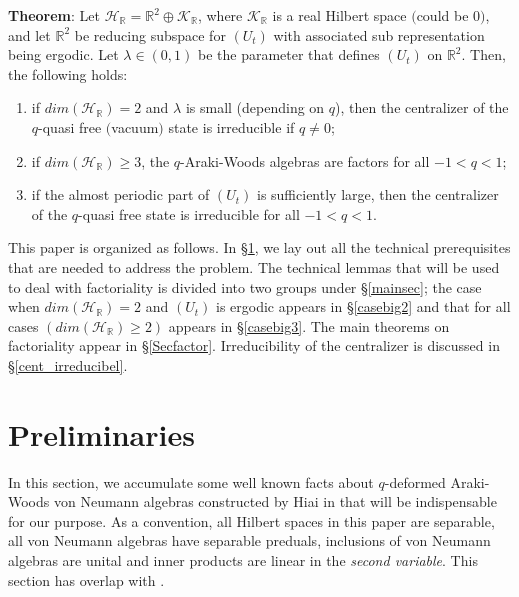 \documentclass[12pt, a4paper,reqno]{amsart}
\theoremstyle{definition}
\renewcommand{\geq}{\geqslant}
\def\R{\mathbb R}
\newcommand{\CH}{\mathcal{H}}
\begin{document}
\noindent \textbf{Theorem}: Let $\CH_\R= \mathbb{R}^2\oplus \mathcal{K}_\R$, where $\mathcal{K}_\R$ is a real Hilbert space $($could be $0)$, and let $\mathbb{R}^2$ be reducing subspace for $(U_t)$ with associated sub representation being ergodic. Let $\lambda\in (0,1)$ be the parameter that defines $(U_t)$ on $\R^2$. Then, the following holds: 
\begin{enumerate}
\item if $dim(\CH_\R)=2$ and $\lambda$ is small (depending on $q$), then the centralizer of the $q$-quasi free $($vacuum$)$ state is irreducible if $q\neq 0$;
\item if $dim(\CH_\R)\geq 3$, the $q$-Araki-Woods algebras are factors for all $-1<q<1$;
\item if the almost periodic part of $(U_t)$ is sufficiently large, then the centralizer of the $q$-quasi free state is irreducible for all $-1<q<1$. \\
\end{enumerate} 
 
This paper is organized as follows. In \S\ref{Araki-Woods}, we lay out all the technical prerequisites that are needed to address the problem. The technical lemmas that will be used to deal with factoriality is divided into two groups under \S\ref{mainsec}; the case when $dim(\CH_\R)=2$ and $(U_t)$ is ergodic appears in \S\ref{casebig2} and that for all cases $(dim(\CH_\R)\geq 2)$ appears in \S\ref{casebig3}. The main theorems on factoriality appear in \S\ref{Secfactor}. Irreducibility of the centralizer is discussed in \S\ref{cent_irreducibel}. 


\section{Preliminaries}\label{Araki-Woods}

In this section, we accumulate some well known facts about $q$-deformed Araki-Woods von Neumann algebras constructed by Hiai in \cite{Hiai} that will be indispensable for our purpose. As a convention, all Hilbert spaces in this paper are separable, all von Neumann algebras have separable preduals, inclusions of von Neumann algebras are unital and inner products are linear in the \emph{ second variable}. This section has overlap with \cite[\S2]{bik-kunal}. 
\end{document}
